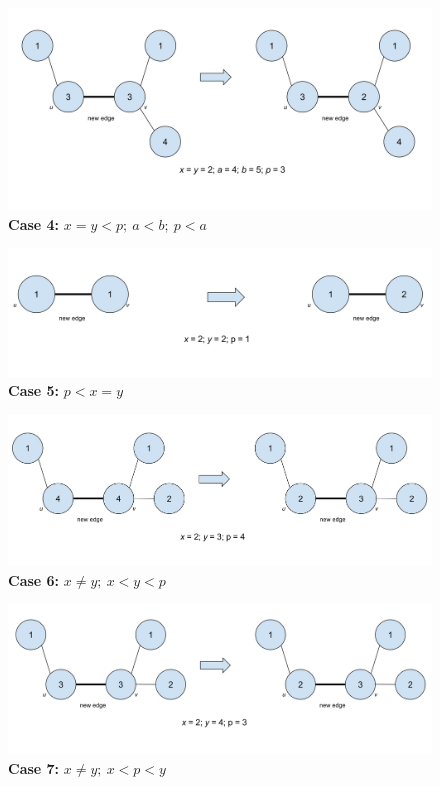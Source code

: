 \documentclass[MTech]{iitmdiss}
\begin{document}
\begin{figure}[h]
    \centering
    \includegraphics[width=\textwidth,keepaspectratio=true]{case4.jpg}
    \caption{
        \textbf{Case 4:} $x=y < p; \: a<b; \: p<a$
    }
    \label{fig:case4}
\end{figure}

\begin{figure}[h]
    \centering
    \includegraphics[width=\textwidth,keepaspectratio=true]{case5.jpg}
    \caption{
        \textbf{Case 5:} $p < x=y$
    }
    \label{fig:case5}
\end{figure}

\begin{figure}[h]
    \centering
    \includegraphics[width=\textwidth,keepaspectratio=true]{case6.jpg}
    \caption{
        \textbf{Case 6:} $x \neq y; \: x < y < p$
    }
    \label{fig:case6}
\end{figure}

\begin{figure}[h]
    \centering
    \includegraphics[width=\textwidth,keepaspectratio=true]{case7.jpg}
    \caption{
        \textbf{Case 7:} $x \neq y; \: x < p < y$
    }
    \label{fig:case7}
\end{figure}
\end{document}
